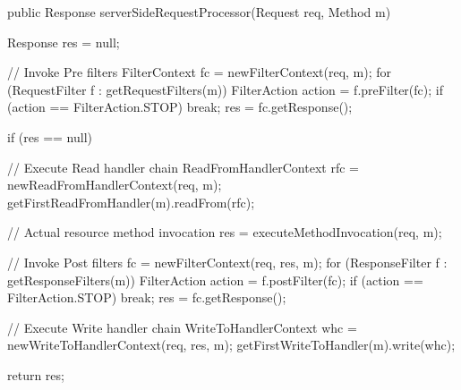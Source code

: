 \begin{listing}{1}
public Response serverSideRequestProcessor(Request req, Method m) {
    Response res = null;

    // Invoke Pre filters
    FilterContext fc = newFilterContext(req, m);
    for (RequestFilter f : getRequestFilters(m)) {
        FilterAction action = f.preFilter(fc);
        if (action == FilterAction.STOP) break;
    }
    res = fc.getResponse();

    if (res == null) {
        // Execute Read handler chain
        ReadFromHandlerContext rfc = newReadFromHandlerContext(req, m);
        getFirstReadFromHandler(m).readFrom(rfc);

        // Actual resource method invocation
        res = executeMethodInvocation(req, m);
    }

    // Invoke Post filters
    fc = newFilterContext(req, res, m);
    for (ResponseFilter f : getResponseFilters(m)) {
        FilterAction action = f.postFilter(fc);
        if (action == FilterAction.STOP) break;
    }
    res = fc.getResponse();       

    // Execute Write handler chain
    WriteToHandlerContext whc = newWriteToHandlerContext(req, res, m);
    getFirstWriteToHandler(m).write(whc);

    return res;
}
\end{listing}